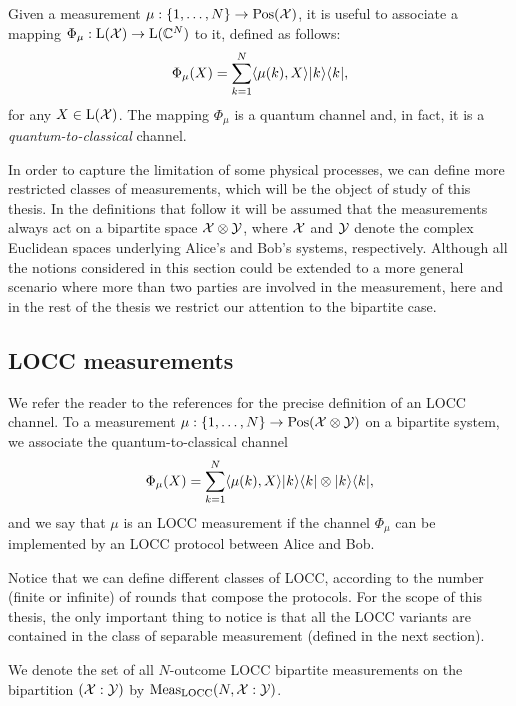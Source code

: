 Given a measurement $\mu: \{1, \ldots, N \} \rightarrow \mathrm{Pos}(\mathcal{X})$,
it is useful to associate a mapping $\Phi_{\mu}:\mathrm{L}(\mathcal{X})\rightarrow\mathrm{L}(\mathbb{C}^{N})$ to it,
defined as follows:
\begin{equation}
\label{eq:measurement-channel}
  \Phi_{\mu}(X) = \sum_{k=1}^{N}\langle \mu(k) , X\rangle\lvert\mspace{0.5mu} k \mspace{0.5mu} \rangle\langle\mspace{0.5mu} k \mspace{0.5mu} \rvert,
\end{equation}
for any $X\in\mathrm{L}(\mathcal{X})$. The mapping $\Phi_{\mu}$ is a quantum channel and, in fact,
it is a \emph{quantum-to-classical} channel.

In order to capture the limitation of some physical processes, we can define more restricted 
classes of measurements, which will be the object of study of this thesis.
In the definitions that follow it will be assumed that the measurements always act on a 
bipartite space $\mathcal{X}\otimes\mathcal{Y}$, where $\mathcal{X}$ and $\mathcal{Y}$ denote the complex Euclidean spaces 
underlying Alice's and Bob's systems, respectively. Although all the notions considered 
in this section could be extended to a more general scenario where more than two parties 
are involved in the measurement, here and in the rest of the thesis we restrict our attention
to the bipartite case.

\subsection{LOCC measurements}

We refer the reader to the references \cite{Mancinska13,Watrous15} for the precise
definition of an LOCC channel.
To a measurement $\mu: \{1, \ldots, N \} \rightarrow \mathrm{Pos}(\mathcal{X}\otimes\mathcal{Y})$ on a bipartite
system, we associate the quantum-to-classical channel
\begin{equation}
\label{eq:measurement-channel-bipartite}
  \Phi_{\mu}(X) = \sum_{k=1}^{N}\langle \mu(k) , X\rangle\lvert\mspace{0.5mu} k \mspace{0.5mu} \rangle\langle\mspace{0.5mu} k \mspace{0.5mu} \rvert\otimes\lvert\mspace{0.5mu} k \mspace{0.5mu} \rangle\langle\mspace{0.5mu} k \mspace{0.5mu} \rvert,
\end{equation}
and we say that $\mu$ is an LOCC measurement if the channel $\Phi_{\mu}$ can be 
implemented by an LOCC protocol between Alice and Bob.

Notice that we can define different classes of LOCC, 
according to the number (finite or infinite) of rounds that compose the protocols.
For the scope of this thesis, the only important thing to notice is that all the LOCC variants
are contained in the class of separable measurement (defined in the next section).

We denote the set of all $N$-outcome LOCC bipartite measurements 
on the bipartition $(\mathcal{X}:\mathcal{Y})$ by $\mathrm{Meas}_{\mathrm{LOCC}}(N, \mathcal{X}:\mathcal{Y})$.

